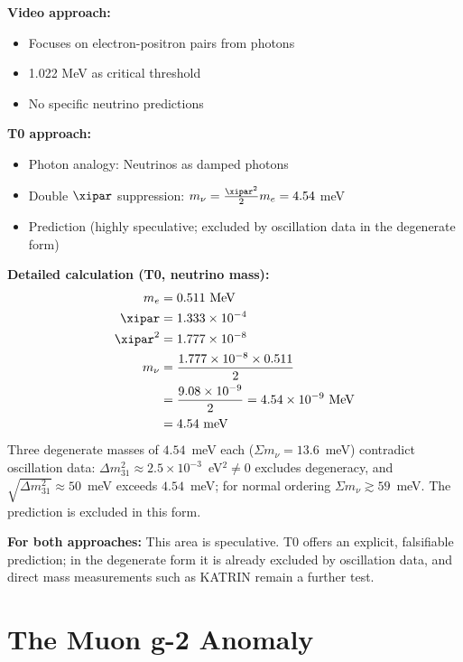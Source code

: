 	\begin{vergleich}
		\textbf{Video approach:}
		\begin{itemize}
			\item Focuses on electron-positron pairs from photons
			\item 1.022 MeV as critical threshold
			\item No specific neutrino predictions
		\end{itemize}
		
		\textbf{T0 approach:}
		\begin{itemize}
			\item Photon analogy: Neutrinos as damped photons
			\item Double $\xipar$ suppression: $m_\nu = \frac{\xipar^2}{2} m_e = 4.54$ meV
			\item Prediction (highly speculative; excluded by oscillation data in the degenerate form)
		\end{itemize}
		
		\textbf{Detailed calculation (T0, neutrino mass):}
		\begin{align}
			m_e &= 0.511 \text{ MeV} \\
			\xipar &= 1.333 \times 10^{-4} \\
			\xipar^2 &= 1.777 \times 10^{-8} \\
			m_\nu &= \frac{1.777 \times 10^{-8} \times 0.511}{2} \\
			&= \frac{9.08 \times 10^{-9}}{2} = 4.54 \times 10^{-9} \text{ MeV} \\
			&= 4.54 \text{ meV}
		\end{align}
		Three degenerate masses of $4.54$~meV each ($\Sigma m_\nu = 13.6$~meV) contradict oscillation data: $\Delta m^2_{31} \approx 2.5\times10^{-3}$~eV$^2 \neq 0$ excludes degeneracy, and $\sqrt{\Delta m^2_{31}} \approx 50$~meV exceeds $4.54$~meV; for normal ordering $\Sigma m_\nu \gtrsim 59$~meV. The prediction is excluded in this form.
	\end{vergleich}
	
	\textbf{For both approaches:} This area is speculative. T0 offers an explicit, falsifiable prediction; in the degenerate form it is already excluded by oscillation data, and direct mass measurements such as KATRIN \cite{katrin_2022} remain a further test.
	
	\section{The Muon g-2 Anomaly}
	
